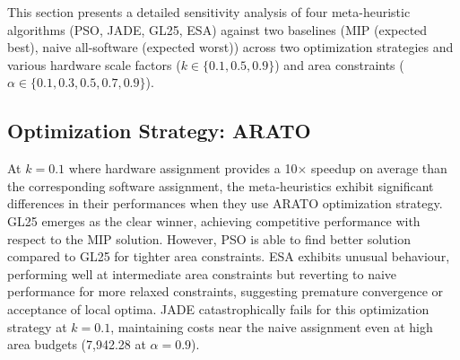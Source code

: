 \begin{figure}[]


\end{figure}



This section presents a detailed sensitivity analysis of four meta-heuristic algorithms (PSO, JADE, GL25, ESA) against two baselines (MIP (expected best), naive all-software (expected worst)) across two optimization strategies and various hardware scale factors ($k \in \{0.1, 0.5, 0.9\}$) and area constraints ($\alpha \in \{0.1, 0.3, 0.5, 0.7, 0.9\}$).

\subsection{Optimization Strategy: ARATO}

At $k=0.1$ where hardware assignment provides a 10$\times$ speedup on average than the corresponding software assignment, the meta-heuristics exhibit significant differences in their performances when they use ARATO optimization strategy. GL25 emerges as the clear winner, achieving competitive performance with respect to the MIP solution. However, PSO is able to find better solution compared to GL25 for tighter area constraints. ESA exhibits unusual behaviour, performing well at intermediate area constraints but reverting to naive performance for more relaxed constraints, suggesting premature convergence or acceptance of local optima. JADE catastrophically fails for this optimization strategy at $k=0.1$, maintaining costs near the naive assignment even at high area budgets (7,942.28 at $\alpha=0.9$).

